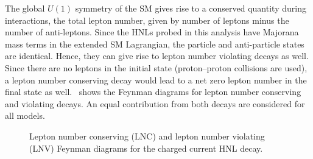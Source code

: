 The global $U(1)$ symmetry of the SM gives rise to a conserved quantity during interactions, the total lepton number, given by number of leptons minus the number of anti-leptons. Since the HNLs probed in this analysis have Majorana mass terms in the extended SM Lagrangian, the particle and anti-particle states are identical. Hence, they can give rise to lepton number violating decays as well. Since there are no leptons in the initial state (proton--proton collisions are used), a lepton number conserving decay would lead to a net zero lepton number in the final state as well.~ shows the Feynman diagrams for lepton number conserving and violating decays. An equal contribution from both decays are considered for all models.

\begin{figure}[ht!]
\centering
{}
\caption{Lepton number conserving (LNC) and lepton number violating (LNV) Feynman diagrams for the charged current HNL decay.}
\label{fig:feynman_lnc_lnv}
\end{figure}


